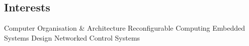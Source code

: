 \documentclass[]{deedy}
\begin{document}
\begin{minipage}[t]{0.69\textwidth}
\begin{flushleft}
%
\section{Interests}
Computer Organisation \& Architecture \textbullet{} Reconfigurable Computing \textbullet{} Embedded Systems Design \textbullet{} Networked Control Systems
\sectionsep

\end{flushleft}
\end{minipage}
\end{document}

